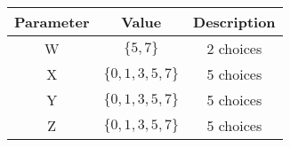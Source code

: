 

\providecommand{\pr}[1]{\ensuremath{\Pr\left(#1\right)}}


\begin{center}
\large \begin{tabular}{|c|c|c|}
\hline
     Parameter & Value & Description \\
     \hline 
     W &  $\{5,7\}$ & 2 choices \\
     \hline
     X &  $\{0,1,3,5,7\}$ & 5 choices\\
     \hline
     Y &  $\{0,1,3,5,7\}$ & 5 choices \\
     \hline
     Z &  $\{0,1,3,5,7\}$ & 5 choices \\
     \hline
 \end{tabular} 
 \end{center}



